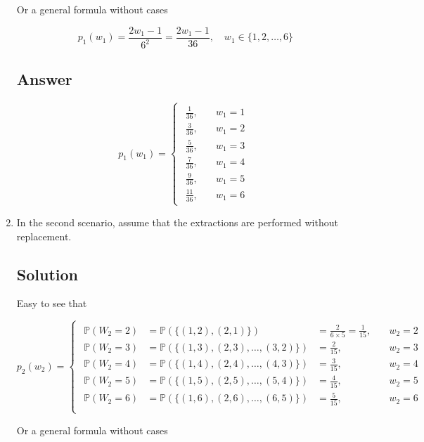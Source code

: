 \documentclass[12pt]{article}
\newcommand{\bP}{\mathbb{P}}
\begin{document}
\begin{enumerate}[start=1,label={\bfseries Part \arabic*:},leftmargin=0in]
			Or a general formula without cases
			
			\[p_1(w_1) = \frac{2w_1-1}{6^2} = \frac{2w_1-1}{36},\quad w_1\in \{1,2,\dots,6\}\]
		
		\subsection*{Answer}
		
			\[\boxed{p_1(w_1) =
				\begin{cases}
					\begin{aligned}
						\frac{1}{36},&\quad w_1 = 1\\
						\frac{3}{36},&\quad w_1 = 2\\
						\frac{5}{36},&\quad w_1 = 3\\
						\frac{7}{36},&\quad w_1 = 4\\
						\frac{9}{36},&\quad w_1 = 5\\
						\frac{11}{36},&\quad w_1 = 6
					\end{aligned}
			\end{cases}}\]
		
		\bigskip\item In the second scenario, assume that the extractions are performed without replacement.
		
		\subsection*{Solution}
		
			Easy to see that
			
			\[
			p_2(w_2) =
			\begin{cases}
				\begin{aligned}
					\bP(W_2 = 2) &= \bP(\{(1,2),(2,1)\}) &= \frac{2}{6\times 5} = \frac{1}{15},&\quad w_2 = 2\\
					\bP(W_2 = 3) &= \bP(\{(1,3),(2,3),\dots,(3,2)\}) &= \frac{2}{15},&\quad w_2 = 3\\
					\bP(W_2 = 4) &= \bP(\{(1,4),(2,4),\dots,(4,3)\}) &= \frac{3}{15},&\quad w_2 = 4\\
					\bP(W_2 = 5) &= \bP(\{(1,5),(2,5),\dots,(5,4)\}) &= \frac{4}{15},&\quad w_2 = 5\\
					\bP(W_2 = 6) &= \bP(\{(1,6),(2,6),\dots,(6,5)\}) &= \frac{5}{15},&\quad w_2 = 6\\
				\end{aligned}
			\end{cases}
			\]
			
			Or a general formula without cases
			

\end{enumerate}
\end{document}
